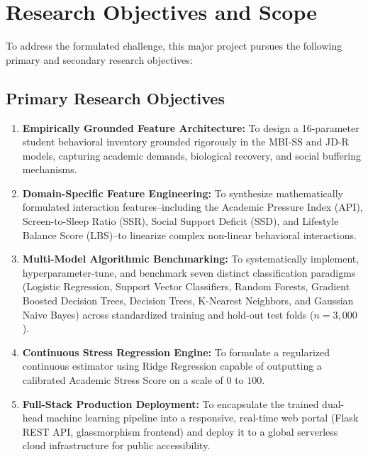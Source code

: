 \documentclass[12pt,a4paper,oneside]{report}
\begin{document}
\section{Research Objectives and Scope}
\label{sec:objectives}
To address the formulated challenge, this major project pursues the following primary and secondary research objectives:

\subsection{Primary Research Objectives}
\begin{enumerate}
    \item \textbf{Empirically Grounded Feature Architecture:} To design a 16-parameter student behavioral inventory grounded rigorously in the MBI-SS and JD-R models, capturing academic demands, biological recovery, and social buffering mechanisms.
    \item \textbf{Domain-Specific Feature Engineering:} To synthesize mathematically formulated interaction features--including the Academic Pressure Index (API), Screen-to-Sleep Ratio (SSR), Social Support Deficit (SSD), and Lifestyle Balance Score (LBS)--to linearize complex non-linear behavioral interactions.
    \item \textbf{Multi-Model Algorithmic Benchmarking:} To systematically implement, hyperparameter-tune, and benchmark seven distinct classification paradigms (Logistic Regression, Support Vector Classifiers, Random Forests, Gradient Boosted Decision Trees, Decision Trees, K-Nearest Neighbors, and Gaussian Naive Bayes) across standardized training and hold-out test folds ($n=3,000$).
    \item \textbf{Continuous Stress Regression Engine:} To formulate a regularized continuous estimator using Ridge Regression capable of outputting a calibrated Academic Stress Score on a scale of $0$ to $100$.
    \item \textbf{Full-Stack Production Deployment:} To encapsulate the trained dual-head machine learning pipeline into a responsive, real-time web portal (Flask REST API, glassmorphism frontend) and deploy it to a global serverless cloud infrastructure for public accessibility.
\end{enumerate}
\end{document}
